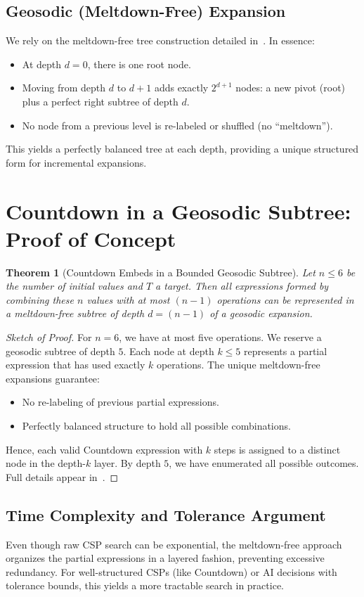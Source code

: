 \documentclass[11pt]{article}
\newtheorem{theorem}{Theorem}
\theoremstyle{definition}
\theoremstyle{remark}
\begin{document}
\subsection{Geosodic (Meltdown-Free) Expansion}
We rely on the meltdown-free tree construction detailed in~\cite{geosodicArxiv}.
In essence:
\begin{itemize}
  \item At depth $d=0$, there is one root node.
  \item Moving from depth $d$ to $d+1$ adds exactly $2^{d+1}$ nodes:
        a new pivot (root) plus a perfect right subtree of depth $d$.
  \item No node from a previous level is re-labeled or shuffled (no ``meltdown'').
\end{itemize}
This yields a perfectly balanced tree at each depth, providing a unique
structured form for incremental expansions.
 \section{Countdown in a Geosodic Subtree: Proof of Concept}
\label{sec:proof}

\begin{theorem}[Countdown Embeds in a Bounded Geosodic Subtree]
\label{thm:countdown-embed}
Let $n \le 6$ be the number of initial values and $T$ a target.
Then all expressions formed by combining these $n$ values with at most
$(n-1)$ operations can be represented in a meltdown-free subtree of
depth $d = (n-1)$ of a geosodic expansion.
\end{theorem}

\begin{proof}[Sketch of Proof]
For $n=6$, we have at most five operations. We reserve a geosodic subtree
of depth $5$. Each node at depth $k \le 5$ represents a partial expression
that has used exactly $k$ operations. The unique meltdown-free expansions
guarantee:
\begin{itemize}
  \item No re-labeling of previous partial expressions.
  \item Perfectly balanced structure to hold all possible combinations.
\end{itemize}
Hence, each valid Countdown expression with $k$ steps is assigned to a
distinct node in the depth-$k$ layer. By depth $5$, we have enumerated all
possible outcomes. Full details appear in~\cite{geosodicArxiv}.
\end{proof}

\subsection{Time Complexity and Tolerance Argument}
Even though raw CSP search can be exponential, the meltdown-free approach
organizes the partial expressions in a layered fashion, preventing excessive
redundancy. For well-structured CSPs (like Countdown) or AI decisions with
tolerance bounds, this yields a more tractable search in practice.
\end{document}
